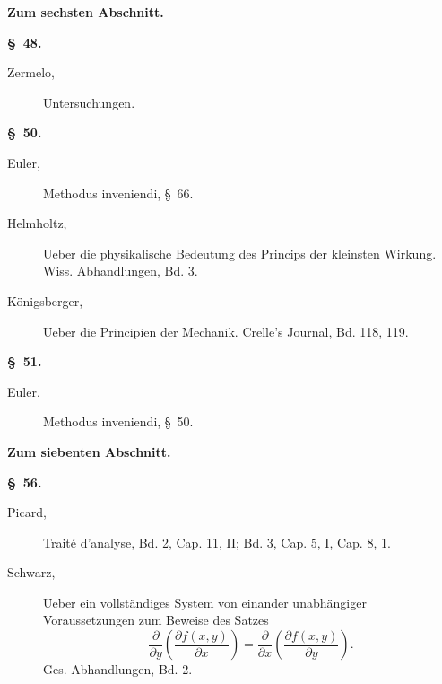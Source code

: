 \documentclass[11pt,a4paper,leqno]{article}
\begin{document}
\begin{center}
{\large\bfseries Zum sechsten Abschnitt.}

{\bfseries \S~48.}
\end{center}

\begin{description}
\item[Zermelo,] Untersuchungen.
\end{description}

\begin{center}{\bfseries \S~50.}\end{center}

\begin{description}
\item[Euler,] Methodus inveniendi, \S~66.

\item[Helmholtz,] Ueber die physikalische Bedeutung des Princips der kleinsten
Wirkung. Wiss. Abhandlungen, Bd. 3.

\item[Königsberger,] Ueber die Principien der Mechanik. Crelle's Journal,
Bd. 118, 119.
\end{description}

\begin{center}{\bfseries \S~51.}\end{center}

\begin{description}
\item[Euler,] Methodus inveniendi, \S~50.
\end{description}

\begin{center}
{\large\bfseries Zum siebenten Abschnitt.}

{\bfseries \S~56.}
\end{center}

\begin{description}
\item[Picard,] Traité d'analyse, Bd. 2, Cap. 11, II; Bd. 3, Cap. 5, I, Cap. 8, 1.

\item[Schwarz,] Ueber ein vollständiges System von einander unabhängiger
Voraussetzungen zum Beweise des Satzes
\[
\frac{\partial}{\partial y}\left(\frac{\partial f(x,y)}{\partial x}\right)
=\frac{\partial}{\partial x}\left(\frac{\partial f(x,y)}{\partial y}\right).
\]
Ges. Abhandlungen, Bd. 2.
\end{description}
\end{document}
